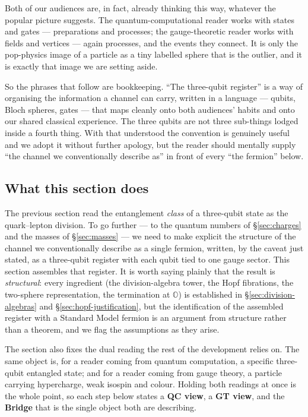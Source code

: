 Both of our audiences are, in fact, already thinking this way, whatever the popular picture
suggests. The quantum-computational reader works with states and gates --- preparations and
processes; the gauge-theoretic reader works with fields and vertices --- again processes, and the
events they connect. It is only the pop-physics image of a particle as a tiny labelled sphere that
is the outlier, and it is exactly that image we are setting aside.

So the phrases that follow are bookkeeping. ``The three-qubit register'' is a way of organising the
information a channel can carry, written in a language --- qubits, Bloch spheres, gates --- that
maps cleanly onto both audiences' habits and onto our shared classical experience. The three qubits
are not three sub-things lodged inside a fourth thing. With that understood the convention is
genuinely useful and we adopt it without further apology, but the reader should mentally supply
``the channel we conventionally describe as'' in front of every ``the fermion'' below.

\subsection{What this section does}

The previous section read the entanglement \emph{class} of a three-qubit state as the
quark--lepton division. To go further --- to the quantum numbers of \S\ref{sec:charges} and the
masses of \S\ref{sec:masses} --- we need to make explicit the structure of the channel we
conventionally describe as a single fermion, written, by the caveat just stated, as a three-qubit
register with each qubit tied to one gauge sector. This section assembles that
register. It is worth saying plainly that the result is \emph{structural}: every ingredient (the
division-algebra tower, the Hopf fibrations, the two-sphere representation, the termination at
$\mathbb{O}$) is established in \S\ref{sec:division-algebras} and
\S\ref{sec:hopf-justification}, but the identification of the assembled register with a Standard
Model fermion is an argument from structure rather than a theorem, and we flag the assumptions as
they arise.

The section also fixes the dual reading the rest of the development relies on. The same object is,
for a reader coming from quantum computation, a specific three-qubit entangled state; and for a
reader coming from gauge theory, a particle carrying hypercharge, weak isospin and colour. Holding
both readings at once is the whole point, so each step below states a \textbf{QC view}, a
\textbf{GT view}, and the \textbf{Bridge} that is the single object both are describing.

